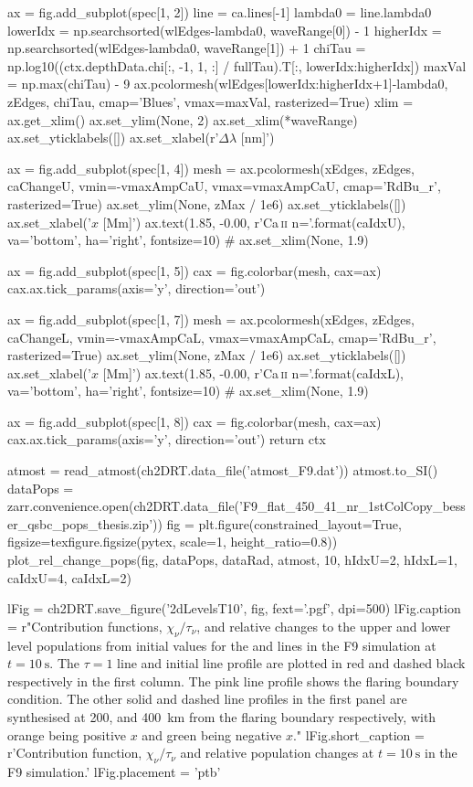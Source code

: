 \begin{pycode}[2DRT]
    ax = fig.add_subplot(spec[1, 2])
    line = ca.lines[-1]
    lambda0 = line.lambda0
    lowerIdx = np.searchsorted(wlEdges-lambda0, waveRange[0]) - 1
    higherIdx = np.searchsorted(wlEdges-lambda0, waveRange[1]) + 1
    chiTau = np.log10((ctx.depthData.chi[:, -1, 1, :] / fullTau).T[:, lowerIdx:higherIdx])
    maxVal = np.max(chiTau) - 9
    ax.pcolormesh(wlEdges[lowerIdx:higherIdx+1]-lambda0, zEdges,
                  chiTau,
                  cmap='Blues', vmax=maxVal, rasterized=True)
    xlim = ax.get_xlim()
    ax.set_ylim(None, 2)
    ax.set_xlim(*waveRange)
    ax.set_yticklabels([])
    ax.set_xlabel(r'$\Delta\lambda$ [nm]')

    ax = fig.add_subplot(spec[1, 4])
    mesh = ax.pcolormesh(xEdges, zEdges, caChangeU, vmin=-vmaxAmpCaU, vmax=vmaxAmpCaU,
                         cmap='RdBu_r', rasterized=True)
    ax.set_ylim(None, zMax / 1e6)
    ax.set_yticklabels([])
    ax.set_xlabel('$x$ [Mm]')
    ax.text(1.85, -0.00, r'Ca\,\textsc{{ii}} n={}'.format(caIdxU), va='bottom', ha='right', fontsize=10)
    # ax.set_xlim(None, 1.9)

    ax = fig.add_subplot(spec[1, 5])
    cax = fig.colorbar(mesh, cax=ax)
    cax.ax.tick_params(axis='y', direction='out')

    ax = fig.add_subplot(spec[1, 7])
    mesh = ax.pcolormesh(xEdges, zEdges, caChangeL, vmin=-vmaxAmpCaL, vmax=vmaxAmpCaL,
                         cmap='RdBu_r', rasterized=True)
    ax.set_ylim(None, zMax / 1e6)
    ax.set_yticklabels([])
    ax.set_xlabel('$x$ [Mm]')
    ax.text(1.85, -0.00, r'Ca\,\textsc{{ii}} n={}'.format(caIdxL), va='bottom', ha='right', fontsize=10)
    # ax.set_xlim(None, 1.9)

    ax = fig.add_subplot(spec[1, 8])
    cax = fig.colorbar(mesh, cax=ax)
    cax.ax.tick_params(axis='y', direction='out')
    return ctx


atmost = read_atmost(ch2DRT.data_file('atmost_F9.dat'))
atmost.to_SI()
dataPops = zarr.convenience.open(ch2DRT.data_file('F9_flat_450_41_nr_1stColCopy_besser_qsbc_pops_thesis.zip'))
fig = plt.figure(constrained_layout=True, figsize=texfigure.figsize(pytex, scale=1, height_ratio=0.8))
plot_rel_change_pops(fig, dataPops, dataRad, atmost, 10, hIdxU=2, hIdxL=1, caIdxU=4, caIdxL=2)

lFig = ch2DRT.save_figure('2dLevelsT10', fig, fext='.pgf', dpi=500)
lFig.caption = r"Contribution functions, $\chi_\nu/\tau_\nu$, and relative changes to the upper and lower level populations from initial values for the \Ha{} and \CaLine{} lines in the F9 simulation at $t=\SI{10}{\second}$. The $\tau=1$ line and initial line profile are plotted in red and dashed black respectively in the first column. The pink line profile shows the flaring boundary condition. The other solid and dashed line profiles in the first panel are synthesised at 200, and \SI{400}{\kilo\metre} from the flaring boundary respectively, with orange being positive $x$ and green being negative $x$."
lFig.short_caption = r'Contribution function, $\chi_\nu/\tau_\nu$ and relative population changes at $t=\SI{10}{\second}$ in the F9 simulation.'
lFig.placement = 'ptb'


\end{pycode}

